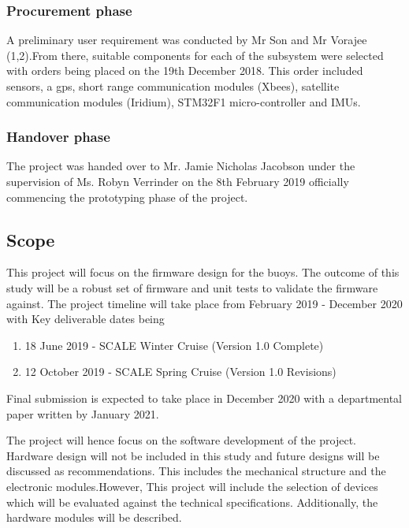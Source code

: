 \subsubsection{Procurement phase}

A preliminary user requirement was conducted by Mr Son and Mr Vorajee (1,2).From there, suitable components for each of the subsystem were selected with orders being placed on the 19th December 2018. This order included sensors, a gps, short range communication modules (Xbees), satellite communication modules (Iridium), STM32F1 micro-controller and IMUs.

\subsubsection{Handover phase}

The project was handed over to Mr. Jamie Nicholas Jacobson under the supervision of Ms. Robyn Verrinder on the 8th February 2019 officially commencing the prototyping phase of the project.

\subsection{Scope}

This project will focus on the firmware design for the buoys. The outcome of this study will be a robust set of firmware and unit tests to validate the firmware against. The project timeline will take place from February 2019 - December 2020 with Key deliverable dates being
\begin{enumerate}
    \item 18 June 2019 - SCALE Winter Cruise  (Version 1.0 Complete)
    \item 12 October 2019 - SCALE Spring Cruise (Version 1.0 Revisions)
\end{enumerate}

Final submission is expected to take place in December 2020 with a departmental paper written by January 2021. \par 


The project will hence focus on the software development of the project. Hardware design will not be included in this study and future designs will be discussed as recommendations. This includes the mechanical structure and the electronic modules.However, This project will include the selection of devices which will be evaluated against the technical specifications. Additionally, the hardware modules will be described.\par 

